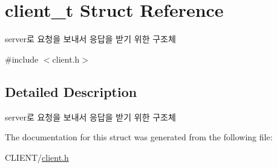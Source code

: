 \hypertarget{structclient__t}{\section{client\-\_\-t Struct Reference}
\label{structclient__t}
}


server로 요청을 보내서 응답을 받기 위한 구조체  




{\ttfamily \#include $<$client.\-h$>$}



\subsection{Detailed Description}
server로 요청을 보내서 응답을 받기 위한 구조체 

The documentation for this struct was generated from the following file\-:\begin{DoxyCompactItemize}
\item 
C\-L\-I\-E\-N\-T/\hyperlink{client_8h}{client.\-h}\end{DoxyCompactItemize}
